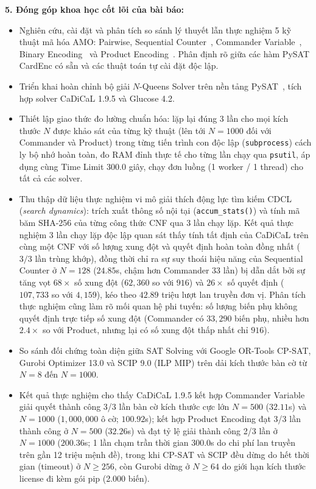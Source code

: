 \documentclass[a4paper,fleqn]{cas-sc}
\begin{document}
\noindent\textbf{5. Đóng góp khoa học cốt lõi của bài báo:}
\begin{itemize}
    \item Nghiên cứu, cài đặt và phân tích so sánh lý thuyết lẫn thực nghiệm 5 kỹ thuật mã hóa AMO: Pairwise, Sequential Counter~\cite{sinz2005towards}, Commander Variable~\cite{klieber2007efficient}, Binary Encoding~\cite{prestwich2009cnf,frisch2010sat} và Product Encoding~\cite{chen2010product}. Phân định rõ giữa các hàm PySAT CardEnc có sẵn và các thuật toán tự cài đặt độc lập.
    \item Triển khai hoàn chỉnh bộ giải $N$-Queens Solver trên nền tảng PySAT~\cite{ignatiev2018pysat}, tích hợp solver CaDiCaL 1.9.5 và Glucose 4.2.
    \item Thiết lập giao thức đo lường chuẩn hóa: lặp lại đúng 3 lần cho mọi kích thước $N$ được khảo sát của từng kỹ thuật (lên tới $N=1000$ đối với Commander và Product) trong từng tiến trình con độc lập (\texttt{subprocess}) cách ly bộ nhớ hoàn toàn, đo RAM đỉnh thực tế cho từng lần chạy qua \texttt{psutil}, áp dụng cùng Time Limit 300.0 giây, chạy đơn luồng (1 worker / 1 thread) cho tất cả các solver.
    \item Thu thập dữ liệu thực nghiệm vi mô giải thích động lực tìm kiếm CDCL (\textit{search dynamics}): trích xuất thông số nội tại (\texttt{accum\_stats()}) và tính mã băm SHA-256 của từng công thức CNF qua 3 lần chạy lặp. Kết quả thực nghiệm 3 lần chạy lặp độc lập quan sát thấy tính tất định của CaDiCaL trên cùng một CNF với số lượng xung đột và quyết định hoàn toàn đồng nhất ($3/3$ lần trùng khớp), đồng thời chỉ ra sự suy thoái hiệu năng của Sequential Counter ở $N=128$ ($24.85$s, chậm hơn Commander 33 lần) bị dẫn dắt bởi sự tăng vọt $68\times$ số xung đột ($62{,}360$ so với $916$) và $26\times$ số quyết định ($107{,}733$ so với $4{,}159$), kéo theo $42.89$ triệu lượt lan truyền đơn vị. Phân tích thực nghiệm cũng làm rõ mối quan hệ phi tuyến: số lượng biến phụ không quyết định trực tiếp số xung đột (Commander có $33{,}290$ biến phụ, nhiều hơn $2.4\times$ so với Product, nhưng lại có số xung đột thấp nhất chỉ $916$).
    \item So sánh đối chứng toàn diện giữa SAT Solving với Google OR-Tools CP-SAT, Gurobi Optimizer 13.0 và SCIP 9.0 (ILP MIP) trên dải kích thước bàn cờ từ $N = 8$ đến $N = 1000$.
    \item Kết quả thực nghiệm cho thấy CaDiCaL 1.9.5 kết hợp Commander Variable giải quyết thành công 3/3 lần bàn cờ kích thước cực lớn $N = 500$ ($32.11$s) và $N = 1000$ ($1{,}000{,}000$ ô cờ; $100.92$s); kết hợp Product Encoding đạt 3/3 lần thành công ở $N = 500$ ($32.26$s) và đạt tỷ lệ giải thành công 2/3 lần ở $N = 1000$ ($200.36$s; 1 lần chạm trần thời gian 300.0s do chi phí lan truyền trên gần 12 triệu mệnh đề), trong khi CP-SAT và SCIP đều dừng do hết thời gian (timeout) ở $N \ge 256$, còn Gurobi dừng ở $N \ge 64$ do giới hạn kích thước license đi kèm gói pip (2.000 biến).
\end{itemize}
\end{document}
